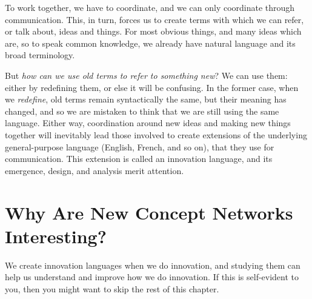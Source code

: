 \documentclass[graybox,envcountchap,sectrefs]{svmono}
\newcommand{\ncnf}{New Concept Network}
\begin{document}
To work together, we have to coordinate, and we can only coordinate through communication. This, in turn, forces us to create terms with which we can refer, or talk about, ideas and things. For most obvious things, and many ideas which are, so to speak common knowledge, we already have natural language and its broad terminology.

But \textit{how can we use old terms to refer to something new}? We can use them: either by redefining them, or else it will be confusing. In the former case, when we \textit{redefine}, old terms remain syntactically the same, but their meaning has changed, and so we are mistaken to think that we are still using the same language. Either way, coordination around new ideas and making new things together will inevitably lead those involved to create extensions of the underlying general-purpose language (English, French, and so on), that they use for communication. This extension is called an innovation language, and its emergence, design, and analysis merit attention.

\section{Why Are \ncnf s Interesting?}
\label{c1-s5}
We create innovation languages when we do innovation, and studying them can help us understand and improve how we do innovation. If this is self-evident to you, then you might want to skip the rest of this chapter.
\end{document}
